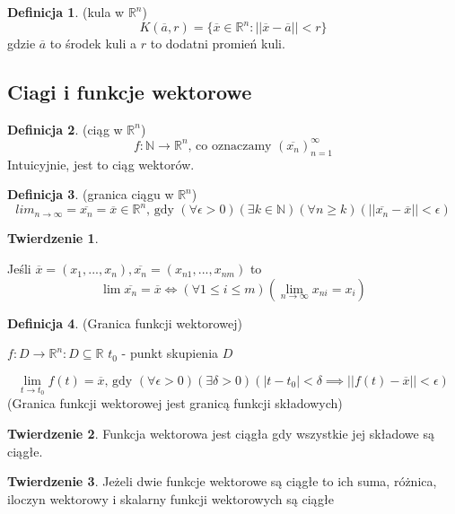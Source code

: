 \documentclass{article}
\theoremstyle{definition}
\newtheorem{de}{Definicja}[subsection]
\theoremstyle{definition}
\newtheorem{tw}{Twierdzenie}[subsection]
\theoremstyle{definition}
\begin{document}
\begin{de}
(kula w $\mathbb{R}^n$)
$$
K(\overline{a}, r) =
\{\overline{x} \in \mathbb{R}^n:||\overline{x}-\overline{a}|| < r\}
$$
gdzie $\overline{a}$ to środek kuli a $r$ to dodatni promień kuli.
\end{de}

\subsection{Ciagi i funkcje wektorowe}


\begin{de}
(ciąg w $\mathbb{R}^n$)
$$
f: \mathbb{N} \to \mathbb{R}^n
\text{, co oznaczamy }
(\overline{x_n})_{n=1}^{\infty}
$$
Intuicyjnie, jest to ciąg wektorów.
\end{de}

\begin{de}
(granica ciągu w $\mathbb{R}^n$)
$$
lim_{n \to \infty} = \overline{x_n} = \overline{x} \in \mathbb{R}^n
\text{, gdy }
(\forall \epsilon>0)(\exists k \in \mathbb{N})(\forall n\geq k)
(||\overline{x_n}-\overline{x}||<\epsilon)
$$
\end{de}

\begin{tw}
\

Jeśli $\overline{x}=(x_1,...,x_n), \overline{x_n} = (x_{n1},...,x_{nm})$
to
$$\lim \overline{x_n} = \overline{x} \iff
(\forall 1 \leq i \leq m)(\lim\limits_{n \to \infty} x_{ni} = x_i)$$
\end{tw}

\begin{de}
(Granica funkcji wektorowej)

$ f: D \to \mathbb{R}^n : D \subseteq \mathbb{R}$
$t_0$ - punkt skupienia $D$

$$
\lim_{t\to t_0} f(t) = \overline{x}
\text{, gdy }
(\forall \epsilon>0)(\exists \delta>0)(|t-t_0|<\delta \implies
||f(t)-\overline{x}||<\epsilon)
$$
(Granica funkcji wektorowej jest granicą funkcji składowych)
\end{de}

\begin{tw}
Funkcja wektorowa jest ciągła gdy wszystkie jej składowe są ciągłe.
\end{tw}

\begin{tw}
Jeżeli dwie funkcje wektorowe są ciągłe to ich suma, różnica, iloczyn wektorowy
i skalarny funkcji wektorowych są ciągłe
\end{tw}
\end{document}
